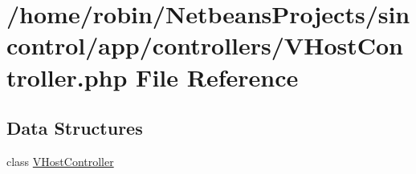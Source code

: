 \hypertarget{_v_host_controller_8php}{}\section{/home/robin/\+Netbeans\+Projects/sincontrol/app/controllers/\+V\+Host\+Controller.php File Reference}
\label{_v_host_controller_8php}
\subsection*{Data Structures}
\begin{DoxyCompactItemize}
\item 
class \hyperlink{class_v_host_controller}{V\+Host\+Controller}
\end{DoxyCompactItemize}

